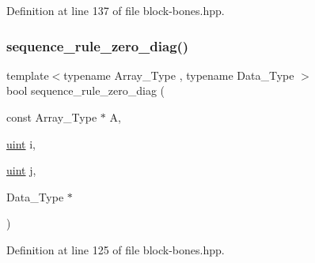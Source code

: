 Definition at line 137 of file block-\/bones.\+hpp.

\mbox{\label{block-bones_8hpp_a0d46af0e4cb648e744267bc926870c56}} 
\subsubsection{\texorpdfstring{sequence\+\_\+rule\+\_\+zero\+\_\+diag()}{sequence\_rule\_zero\_diag()}}
{\footnotesize\ttfamily template$<$typename Array\+\_\+\+Type , typename Data\+\_\+\+Type $>$ \\
bool sequence\+\_\+rule\+\_\+zero\+\_\+diag (\begin{DoxyParamCaption}\item[{const Array\+\_\+\+Type $\ast$}]{A,  }\item[{\hyperlink{typedefs_8hpp_a91ad9478d81a7aaf2593e8d9c3d06a14}{uint}}]{i,  }\item[{\hyperlink{typedefs_8hpp_a91ad9478d81a7aaf2593e8d9c3d06a14}{uint}}]{j,  }\item[{Data\+\_\+\+Type $\ast$}]{ }\end{DoxyParamCaption})\hspace{0.3cm}{\ttfamily [inline]}}



Definition at line 125 of file block-\/bones.\+hpp.

